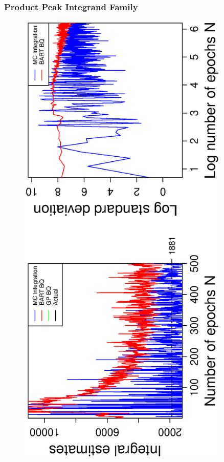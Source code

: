 \subsubsection*{Product Peak Integrand Family}
\vspace{-1.5cm}
\begin{figure}[H]
  \centering
  \hspace{-1.6cm}
  \begin{minipage}[b]{0.4\textwidth}
    \includegraphics[width = 0.9\textwidth, angle = -90]{report/Figures/6/convergenceMean61Dimensions.eps}

\end{minipage}
\end{figure}

